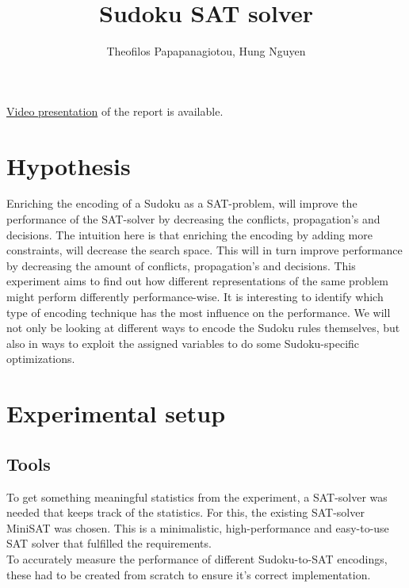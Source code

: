 \documentclass[letterpaper]{article}
\begin{document}
\title{Sudoku SAT solver}
\author{Theofilos Papapanagiotou, Hung Nguyen}

\maketitle


\href{https://www.youtube.com/watch?v=tk7kIJBqUiQ}{Video presentation} of the report is available.

\section{Hypothesis}
Enriching the encoding of a Sudoku as a SAT-problem, will improve the performance of the SAT-solver by decreasing the conflicts, propagation's and decisions.
The intuition here is that enriching the encoding by adding more constraints, will decrease the search space. This will in turn improve performance by decreasing the amount of conflicts, propagation's and decisions.
This experiment aims to find out how different representations of the same problem might perform differently performance-wise. It is interesting to identify which type of encoding technique has the most influence on the performance. We will not only be looking at different ways to encode the Sudoku rules themselves, but also in ways to exploit the assigned variables to do some Sudoku-specific optimizations.

\section{Experimental setup}
\subsection{Tools}
To get something meaningful statistics from the experiment, a SAT-solver was needed that keeps track of the statistics. For this, the existing SAT-solver MiniSAT\cite{sorensson2005minisat} was chosen. This is a minimalistic, high-performance and easy-to-use SAT solver that fulfilled the requirements.\\
To accurately measure the performance of different Sudoku-to-SAT encodings, these had to be created from scratch to ensure it's correct implementation.
\end{document}
